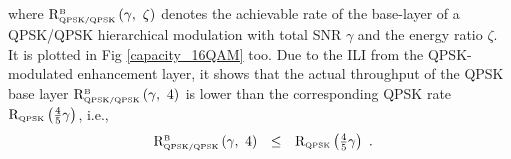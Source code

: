 \documentclass[conference]{IEEEtran}
\begin{document}
\noindent where ${\rm R}_{\mbox{\tiny QPSK/QPSK}}^{\mbox{\tiny
B}}\left(\gamma,\ \zeta\right)$ denotes the achievable rate of the
base-layer of a QPSK/QPSK hierarchical modulation with total SNR
$\gamma$ and the energy ratio $\zeta$. It is plotted in Fig
\ref{capacity_16QAM} too. Due to the ILI from the QPSK-modulated
enhancement layer, it shows that the actual throughput of the QPSK
base layer ${\rm R}_{\mbox{\tiny QPSK/QPSK}}^{\mbox{\tiny
B}}\left(\gamma,\ 4 \right)$ is lower than the corresponding QPSK
rate ${\rm R}_{\mbox{\tiny QPSK}}\left(\frac{4}{5}\gamma\right)$,
i.e.,
\begin{equation}
\begin{array}{rcl}
{\rm R}_{\mbox{\tiny QPSK/QPSK}}^{\mbox{\tiny B}}\left(\gamma,\ 4
\right)&\leq&{\rm R}_{\mbox{\tiny QPSK}}
\left(\frac{4}{5}\gamma\right)
\end{array}.\label{R_16QAM_B2}
\end{equation}
\begin{figure}
\end{figure}
\end{document}
